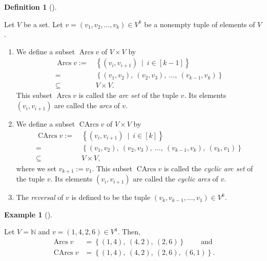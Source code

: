 \documentclass[numbers=enddot,12pt,final,onecolumn,notitlepage]{scrartcl}%
\numberwithin{exer}{section}
\theoremstyle{definition}
\newtheorem{defi}[theo]{Definition}
\newenvironment{definition}[1][]
{\begin{defi}[#1]\begin{leftbar}}
{\end{leftbar}\end{defi}}
\newtheorem{exam}[theo]{Example}
\newenvironment{example}[1][]
{\begin{exam}[#1]\begin{leftbar}}
{\end{leftbar}\end{exam}}
\begin{document}
\begin{definition}
\label{def.Arcs-and-Carcs}Let $V$ be a set. Let $v=\left(  v_{1},v_{2}%
,\ldots,v_{k}\right)  \in V^{k}$ be a nonempty tuple of elements of $V$.

\begin{enumerate}
\item[\textbf{(a)}] We define a subset $\operatorname*{Arcs}v$ of $V\times V$
by
\begin{align}
\operatorname*{Arcs}v:=\  &  \left\{  \left(  v_{i},v_{i+1}\right)
\ \mid\ i\in\left[  k-1\right]  \right\} \nonumber\\
=\  &  \left\{  \left(  v_{1},v_{2}\right)  ,\ \left(  v_{2},v_{3}\right)
,\ \ldots,\ \left(  v_{k-1},v_{k}\right)  \right\}
\label{eq.def.Arcs-and-Carcs.a.2}\\
\subseteq\  &  V\times V.\nonumber
\end{align}
This subset $\operatorname*{Arcs}v$ is called the \emph{arc set} of the tuple
$v$. Its elements $\left(  v_{i},v_{i+1}\right)  $ are called the \emph{arcs}
of $v$.

\item[\textbf{(b)}] We define a subset $\operatorname*{CArcs}v$ of $V\times V$
by%
\begin{align}
\operatorname*{CArcs}v:=\  &  \left\{  \left(  v_{i},v_{i+1}\right)
\ \mid\ i\in\left[  k\right]  \right\} \nonumber\\
=\  &  \left\{  \left(  v_{1},v_{2}\right)  ,\ \left(  v_{2},v_{3}\right)
,\ \ldots,\ \left(  v_{k-1},v_{k}\right)  ,\ \left(  v_{k},v_{1}\right)
\right\} \label{eq.def.Arcs-and-Carcs.b.2}\\
\subseteq\  &  V\times V,\nonumber
\end{align}
where we set $v_{k+1}:=v_{1}$. This subset $\operatorname*{CArcs}v$ is called
the \emph{cyclic arc set} of the tuple $v$. Its elements $\left(
v_{i},v_{i+1}\right)  $ are called the \emph{cyclic arcs} of $v$.

\item[\textbf{(c)}] The \emph{reversal} of $v$ is defined to be the tuple
$\left(  v_{k},v_{k-1},\ldots,v_{1}\right)  \in V^{k}$.
\end{enumerate}
\end{definition}

\begin{example}
Let $V=\mathbb{N}$ and $v=\left(  1,4,2,6\right)  \in V^{4}$. Then,
\begin{align*}
\operatorname*{Arcs}v  &  =\left\{  \left(  1,4\right)  ,\ \left(  4,2\right)
,\ \left(  2,6\right)  \right\}  \ \ \ \ \ \ \ \ \ \ \text{and}\\
\operatorname*{CArcs}v  &  =\left\{  \left(  1,4\right)  ,\ \left(
4,2\right)  ,\ \left(  2,6\right)  ,\ \left(  6,1\right)  \right\}  .
\end{align*}

\end{example}
\end{document}
